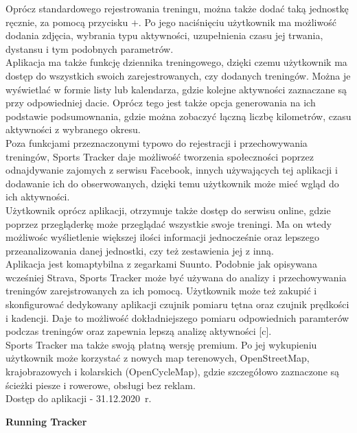 \documentclass[a4paper,12pt,reqno]{article}
\begin{document}
Oprócz standardowego rejestrowania treningu, można także dodać taką jednostkę ręcznie, za pomocą przycisku $+$. Po jego naciśnięciu użytkownik ma możliwość dodania zdjęcia, wybrania typu aktywności, uzupełnienia czasu jej trwania, dystansu i tym podobnych parametrów.\\

Aplikacja ma także funkcję dziennika treningowego, dzięki czemu użytkownik ma dostęp do wszystkich swoich zarejestrowanych, czy dodanych treningów. Można je wyświetlać w formie listy lub kalendarza, gdzie kolejne aktywności zaznaczane są przy odpowiedniej dacie. Oprócz tego jest także opcja generowania na ich podstawie podsumownania, gdzie można zobaczyć łączną liczbę kilometrów, czasu aktywności z wybranego okresu.\\

Poza funkcjami przeznaczonymi typowo do rejestracji i przechowywania treningów, Sports Tracker daje możliwość tworzenia społeczności poprzez odnajdywanie zajomych z serwisu Facebook, innych używających tej aplikacji i dodawanie ich do obserwowanych, dzięki temu użytkownik może mieć wgląd do ich aktywności.\\

Użytkownik oprócz aplikacji, otrzymuje także dostęp do serwisu online, gdzie poprzez przegląderkę może przeglądać wszystkie swoje treningi. Ma on wtedy możliwośc wyślietlenie większej ilości informacji jednocześnie oraz lepszego przeanalizowania danej jednostki, czy też zestawienia jej z inną.\\

Aplikacja jest komaptybilna z zegarkami Suunto. Podobnie jak opisywana wcześniej Strava, Sports Tracker może być używana do analizy i przechowywania treningów zarejstrowanych za ich pomocą. Użytkownik może też zakupić i skonfigurować dedykowany aplikacji czujnik pomiaru tętna oraz czujnik prędkości i kadencji. Daje to możliwość dokładniejszego pomiaru odpowiednich paramterów podczas treningów oraz zapewnia lepszą analizę aktywności [c].\\

Sports Tracker ma także swoją płatną wersję premium. Po jej wykupieniu użytkownik może korzystać z nowych map terenowych, OpenStreetMap, krajobrazowych i kolarskich (OpenCycleMap), gdzie szczegółowo zaznaczone są ścieżki piesze i rowerowe, obsługi bez reklam.\\

Dostęp do aplikacji - 31.12.2020~r.
\vspace{1cm}
\begin{flushleft}
	\textbf{Running Tracker}
\end{flushleft}
\end{document}

